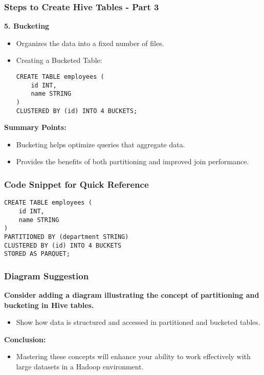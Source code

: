 \documentclass[aspectratio=169]{beamer}
\begin{document}
\begin{frame}[fragile]
    \frametitle{Steps to Create Hive Tables - Part 3}
    \textbf{5. Bucketing}
    \begin{itemize}
        \item Organizes the data into a fixed number of files.
        \item Creating a Bucketed Table:
        \begin{lstlisting}
CREATE TABLE employees (
    id INT,
    name STRING
)
CLUSTERED BY (id) INTO 4 BUCKETS;
        \end{lstlisting}
    \end{itemize}

    \textbf{Summary Points:}
    \begin{itemize}
        \item Bucketing helps optimize queries that aggregate data.
        \item Provides the benefits of both partitioning and improved join performance.
    \end{itemize}
\end{frame}

\begin{frame}[fragile]
    \frametitle{Code Snippet for Quick Reference}
    \begin{lstlisting}
CREATE TABLE employees (
    id INT,
    name STRING
)
PARTITIONED BY (department STRING)
CLUSTERED BY (id) INTO 4 BUCKETS
STORED AS PARQUET;
    \end{lstlisting}
\end{frame}

\begin{frame}
    \frametitle{Diagram Suggestion}
    \textbf{Consider adding a diagram illustrating the concept of partitioning and bucketing in Hive tables.}
    
    \begin{itemize}
        \item Show how data is structured and accessed in partitioned and bucketed tables.
    \end{itemize}
    
    \textbf{Conclusion:}
    \begin{itemize}
        \item Mastering these concepts will enhance your ability to work effectively with large datasets in a Hadoop environment.
    \end{itemize}
\end{frame}
\end{document}
